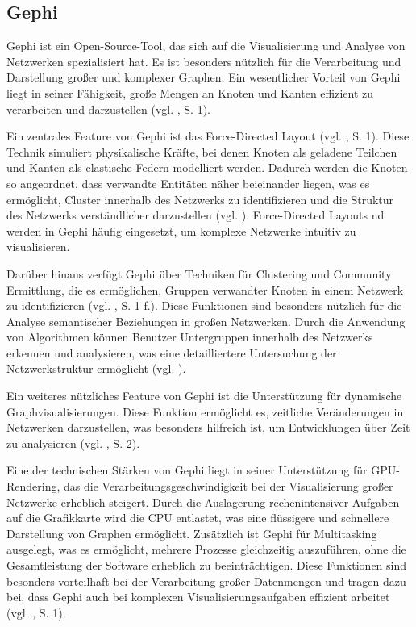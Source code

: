 \subsection{Gephi}

Gephi ist ein Open-Source-Tool, das sich auf die Visualisierung und Analyse von Netzwerken spezialisiert hat. Es ist besonders nützlich für die Verarbeitung und Darstellung großer und komplexer Graphen. Ein wesentlicher Vorteil von Gephi liegt in seiner Fähigkeit, große Mengen an Knoten und Kanten effizient zu verarbeiten und darzustellen (vgl. \cite{gephi:Bastian}, S. 1).

Ein zentrales Feature von Gephi ist das Force-Directed Layout (vgl. \cite{gephi:Bastian}, S. 1). Diese Technik simuliert physikalische Kräfte, bei denen Knoten als geladene Teilchen und Kanten als elastische Federn modelliert werden. Dadurch werden die Knoten so angeordnet, dass verwandte Entitäten näher beieinander liegen, was es ermöglicht, Cluster innerhalb des Netzwerks zu identifizieren und die Struktur des Netzwerks verständlicher darzustellen (vgl. \cite{forceGraph:yWorks}). Force-Directed Layouts nd werden in Gephi häufig eingesetzt, um komplexe Netzwerke intuitiv zu visualisieren.

Darüber hinaus verfügt Gephi über Techniken für Clustering und Community Ermittlung, die es ermöglichen, Gruppen verwandter Knoten in einem Netzwerk zu identifizieren (vgl. \cite{gephi:Bastian}, S. 1 f.). Diese Funktionen sind besonders nützlich für die Analyse semantischer Beziehungen in großen Netzwerken. Durch die Anwendung von Algorithmen können Benutzer Untergruppen innerhalb des Netzwerks erkennen und analysieren, was eine detailliertere Untersuchung der Netzwerkstruktur ermöglicht (vgl. \cite{clusteringGraph:yWorks}).

Ein weiteres nützliches Feature von Gephi ist die Unterstützung für dynamische Graphvisualisierungen. Diese Funktion ermöglicht es, zeitliche Veränderungen in Netzwerken darzustellen, was besonders hilfreich ist, um Entwicklungen über Zeit zu analysieren (vgl. \cite{gephi:Bastian}, S. 2).

Eine der technischen Stärken von Gephi liegt in seiner Unterstützung für GPU-Rendering, das die Verarbeitungsgeschwindigkeit bei der Visualisierung großer Netzwerke erheblich steigert. Durch die Auslagerung rechenintensiver Aufgaben auf die Grafikkarte wird die CPU entlastet, was eine flüssigere und schnellere Darstellung von Graphen ermöglicht. Zusätzlich ist Gephi für Multitasking ausgelegt, was es ermöglicht, mehrere Prozesse gleichzeitig auszuführen, ohne die Gesamtleistung der Software erheblich zu beeinträchtigen. Diese Funktionen sind besonders vorteilhaft bei der Verarbeitung großer Datenmengen und tragen dazu bei, dass Gephi auch bei komplexen Visualisierungsaufgaben effizient arbeitet (vgl. \cite{gephi:Bastian}, S. 1).


